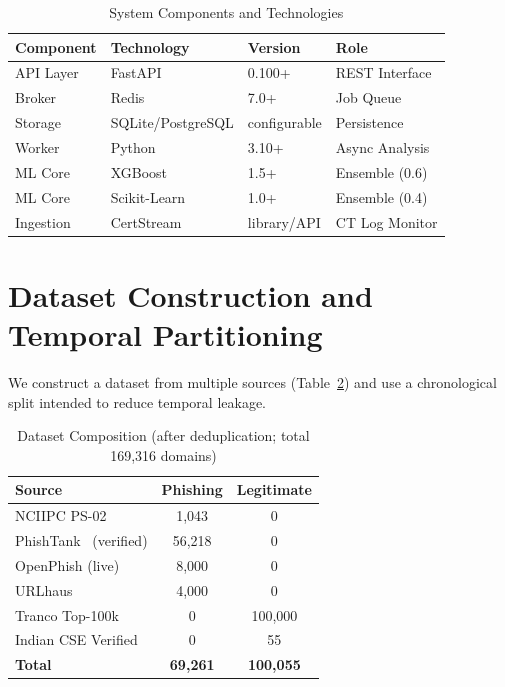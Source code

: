 \documentclass[conference]{IEEEtran}
\begin{document}
\begin{table}[htbp]
\centering
\footnotesize
\caption{System Components and Technologies}
\begin{tabularx}{\columnwidth}{@{}l l l X@{}}
\toprule
\textbf{Component} & \textbf{Technology} & \textbf{Version} & \textbf{Role} \\
\midrule
API Layer & FastAPI & 0.100+ & REST Interface \\
Broker & Redis & 7.0+ & Job Queue \\
Storage & SQLite/PostgreSQL & configurable & Persistence \\
Worker & Python & 3.10+ & Async Analysis \\
ML Core & XGBoost~\cite{xgboost} & 1.5+ & Ensemble (0.6) \\
ML Core & Scikit-Learn~\cite{pedregosa2011} & 1.0+ & Ensemble (0.4) \\
Ingestion & CertStream~\cite{certstream} & library/API & CT Log Monitor \\
\bottomrule
\end{tabularx}
\label{tab:components}
\end{table}

\section{Dataset Construction and Temporal Partitioning}
\label{sec:dataset}

We construct a dataset from multiple sources (Table~\ref{tab:dataset_sources}) and use a chronological split intended to reduce temporal leakage.

\begin{table}[htbp]
\centering
\small
\caption{Dataset Composition (after deduplication; total 169,316 domains)}
\begin{tabular}{lcc}
\toprule
\textbf{Source} & \textbf{Phishing} & \textbf{Legitimate} \\
\midrule
NCIIPC PS-02 & 1,043 & 0 \\
PhishTank~\cite{phishtank} (verified) & 56,218 & 0 \\
OpenPhish (live) & 8,000 & 0 \\
URLhaus & 4,000 & 0 \\
Tranco Top-100k & 0 & 100,000 \\
Indian CSE Verified & 0 & 55 \\
\textbf{Total} & \textbf{69,261} & \textbf{100,055} \\
\bottomrule
\end{tabular}
\label{tab:dataset_sources}
\end{table}
\end{document}
